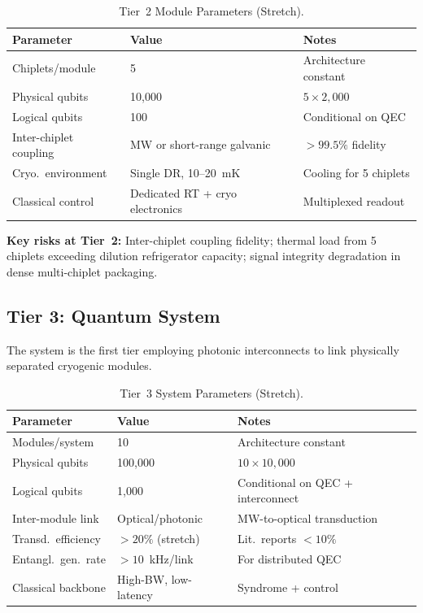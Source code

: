 \documentclass[conference]{IEEEtran}
\begin{document}
\begin{table}[htbp]
\centering
\caption{Tier~2 Module Parameters (Stretch).}
\label{tab:module}
\begin{tabular}{llp{3cm}}
\toprule
\textbf{Parameter} & \textbf{Value} & \textbf{Notes} \\
\midrule
Chiplets/module & 5 & Architecture constant \\
Physical qubits & 10,000 & $5 \times 2{,}000$ \\
Logical qubits & 100 & Conditional on QEC \\
Inter-chiplet coupling & MW or short-range galvanic & $> 99.5\%$ fidelity \\
Cryo.\ environment & Single DR, 10--20~mK & Cooling for 5 chiplets \\
Classical control & Dedicated RT + cryo electronics & Multiplexed readout \\
\bottomrule
\end{tabular}
\end{table}

\textbf{Key risks at Tier~2:} Inter-chiplet coupling fidelity; thermal load from 5 chiplets exceeding dilution refrigerator capacity; signal integrity degradation in dense multi-chiplet packaging.

\subsection{Tier 3: Quantum System}

The system is the first tier employing photonic interconnects to link physically separated cryogenic modules.

\begin{table}[htbp]
\centering
\caption{Tier~3 System Parameters (Stretch).}
\label{tab:system}
\begin{tabular}{llp{2.5cm}}
\toprule
\textbf{Parameter} & \textbf{Value} & \textbf{Notes} \\
\midrule
Modules/system & 10 & Architecture constant \\
Physical qubits & 100,000 & $10 \times 10{,}000$ \\
Logical qubits & 1,000 & Conditional on QEC + interconnect \\
Inter-module link & Optical/photonic & MW-to-optical transduction \\
Transd.\ efficiency & $> 20\%$ (stretch) & Lit.\ reports $< 10\%$ \\
Entangl.\ gen.\ rate & $> 10$~kHz/link & For distributed QEC \\
Classical backbone & High-BW, low-latency & Syndrome + control \\
\bottomrule
\end{tabular}
\end{table}
\end{document}
